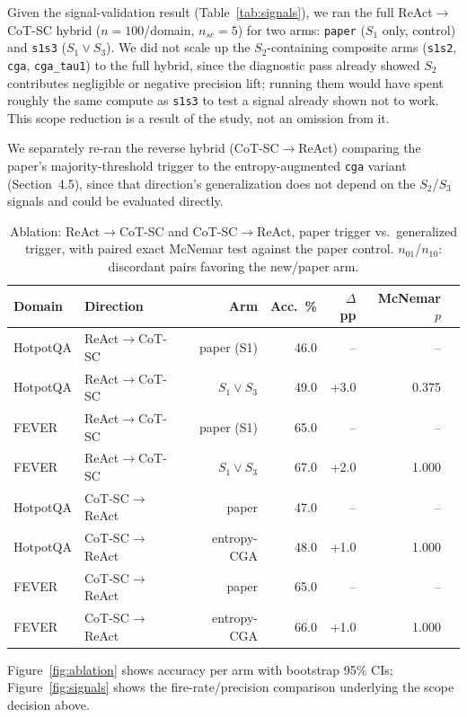\label{sec:ablation}
Given the signal-validation result (Table~\ref{tab:signals}), we ran the
full ReAct$\to$CoT-SC hybrid ($n{=}100$/domain, $n_{sc}{=}5$) for two
arms: \texttt{paper} ($S_1$ only, control) and \texttt{s1s3}
($S_1 \lor S_3$). We did not scale up the $S_2$-containing composite arms
(\texttt{s1s2}, \texttt{cga}, \texttt{cga\_tau1}) to the full hybrid,
since the diagnostic pass already showed $S_2$ contributes negligible or
negative precision lift; running them would have spent roughly the same
compute as \texttt{s1s3} to test a signal already shown not to work. This
scope reduction is a result of the study, not an omission from it.

We separately re-ran the reverse hybrid (CoT-SC$\to$ReAct) comparing the
paper's majority-threshold trigger to the entropy-augmented \texttt{cga}
variant (Section~4.5), since that direction's generalization does not
depend on the $S_2$/$S_3$ signals and could be evaluated directly.

\begin{table}[t]
\caption{Ablation: ReAct$\to$CoT-SC and CoT-SC$\to$ReAct, paper trigger vs.\
generalized trigger, with paired exact McNemar test against the paper
control. $n_{01}$/$n_{10}$: discordant pairs favoring the new/paper arm.}
\label{tab:ablation}
\centering\small
\begin{tabular}{@{}llrrrrr@{}}
\toprule
Domain & Direction & Arm & Acc.\ \% & $\Delta$pp & McNemar $p$ \\
\midrule
HotpotQA & ReAct$\to$CoT-SC & paper (S1) & 46.0 & --  & -- \\
HotpotQA & ReAct$\to$CoT-SC & $S_1 \lor S_3$ & 49.0 & +3.0 & 0.375 \\
FEVER    & ReAct$\to$CoT-SC & paper (S1) & 65.0 & --  & -- \\
FEVER    & ReAct$\to$CoT-SC & $S_1 \lor S_3$ & 67.0 & +2.0 & 1.000 \\
\addlinespace
HotpotQA & CoT-SC$\to$ReAct & paper & 47.0 & --  & -- \\
HotpotQA & CoT-SC$\to$ReAct & entropy-CGA & 48.0 & +1.0 & 1.000 \\
FEVER    & CoT-SC$\to$ReAct & paper & 65.0 & --  & -- \\
FEVER    & CoT-SC$\to$ReAct & entropy-CGA & 66.0 & +1.0 & 1.000 \\
\bottomrule
\end{tabular}
\end{table}

Figure~\ref{fig:ablation} shows accuracy per arm with bootstrap 95\% CIs;
Figure~\ref{fig:signals} shows the fire-rate/precision comparison
underlying the scope decision above.

